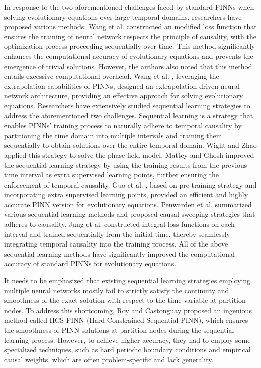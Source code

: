 \documentclass[preprint]{elsarticle}
\numberwithin{table}{section}
\numberwithin{equation}{section}
\numberwithin{figure}{section}
\begin{document}
\begin{CJK}{UTF8}{gbsn}
In response to the two aforementioned challenges faced by  {standard}  PINNs when solving evolutionary equations over  large temporal domains, researchers have proposed various methods. Wang et al. \cite{Wang2024RespectingCF} constructed an modified loss function that ensures the training  of neural network 
respects the principle of causality, with the optimization process proceeding sequentially over time. This method significantly enhances the computational accuracy of evolutionary equations and prevents the emergence of trivial solutions. However, the authors also noted that this method entails excessive computational overhead. Wang et al. \cite{WANG2024106998}, leveraging the extrapolation capabilities of PINNs,  {designed}   an extrapolation-driven neural network architecture, providing an effective approach for solving evolutionary equations.
Researchers have extensively studied sequential learning  {strategies} to address the aforementioned two challenges. Sequential learning is a strategy that enables PINNs' training process to naturally adhere to temporal causality by partitioning the time domain into multiple intervals and training them sequentially to obtain solutions over the entire temporal domain. Wight and Zhao \cite{CiCP-29-930} applied this strategy to solve the phase-field model. Mattey and Ghosh \cite{MATTEY2022114474} improved the sequential learning strategy by using the training results from the previous time interval as  {extra supervised learning points}, further ensuring the enforcement of temporal causality. Guo et al. \cite{guo2023pretraining}, based on pre-training strategy and incorporating  {extra supervised learning points}, provided an efficient and highly accurate PINN version for evolutionary equations. Penwarden et al. \cite{PENWARDEN2023112464} summarized various sequential learning methods and proposed causal sweeping strategies that adheres to causality. Jung et al. \cite{JUNG2024117036} constructed integral loss functions on each interval and trained sequentially from the initial time, thereby seamlessly integrating temporal causality into the training process. All of the above sequential learning methods have significantly improved the computational accuracy of standard PINNs for evolutionary equations.

 

It needs to be emphasized that existing sequential learning strategies employing multiple neural networks mostly fail to strictly satisfy the continuity and smoothness of the exact solution with respect to the time variable at partition nodes. To address this shortcoming, Roy and Castonguay \cite{Exact} proposed an ingenious method called HCS-PINN (Hard Constrained Sequential PINN), which ensures the smoothness of PINN solutions at partition nodes during the sequential learning process. However, to achieve higher accuracy, they had to employ some specialized techniques, such as hard periodic boundary conditions and empirical causal weights, which are often problem-specific and lack generality.


\end{CJK}
\end{document}
